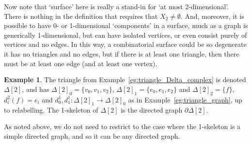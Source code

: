\documentclass{tufte-handout}
\theoremstyle{definition}
\newtheorem{example}{Example}
\begin{document}
Now note that `surface' here is really a stand-in for `at most 2-dimensional'. There is nothing
in the definition that requires that $X_2\neq \emptyset$. And,
moreover, it is possible 
to have 0- or 1-dimensional `components' in a surface, much as a graph is generically 1-dimensional,
but can have isolated vertices, or even consist purely of vertices and no edges. In this way, 
a combinatorial surface could be so degenerate it has no triangles and no edges, but if 
there is at least one triangle, then there must be at least one edge (and at least one vertex).


\begin{example}
The triangle from Example~\ref{eg:triangle_Delta_complex} is denoted $\Delta[2]$, and has 
$\Delta[2]_0 = \{v_0,v_1,v_2\}$, $\Delta[2]_1 = \{e_0,e_1,e_2\}$ and $\Delta[2]_2 = \{f\}$, 
$d^2_i(f) = e_i$ and $d^1_0,d^1_1\colon \Delta[2]_1\to \Delta[2]_0$ 
as in Example~\ref{eg:triangle_graph}, up to relabelling. The 1-skeleton of $\Delta[2]$ 
is the directed graph $\partial\Delta[2]$.
\end{example}

As noted above, we do not need to restrict to the case where the 1-skeleton is a simple directed
graph, and so it can be any directed graph.
\end{document}
